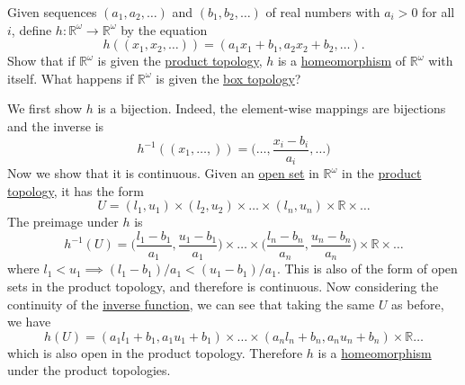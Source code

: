   \begin{exercise}[Munkres 19.8]
    Given sequences $(a_1, a_2, \ldots)$ and $(b_1, b_2, \ldots)$ of real numbers with $a_i > 0$ for all $i$, define $h : \mathbb{R}^\omega \to \mathbb{R}^\omega$ by the equation
    \begin{equation}
      h((x_1, x_2, \ldots)) = (a_1x_1 + b_1, a_2x_2 + b_2, \ldots).
    \end{equation}
    Show that if $\mathbb{R}^\omega$ is given the \hyperref[def:product-topology]{product topology}, $h$ is a \hyperref[def:homeomorphism]{homeomorphism} of $\mathbb{R}^\omega$ with itself. What happens if $\mathbb{R}^\omega$ is given the \hyperref[def:box-topology]{box topology}?
  \end{exercise}
  \begin{solution}
    We first show $h$ is a bijection. Indeed, the element-wise mappings are bijections and the inverse is 
    \begin{equation}
      h^{-1} ((x_1, \ldots, )) = \bigg(\ldots,  \frac{x_i - b_i}{a_i}, \ldots \bigg)
    \end{equation} 
    Now we show that it is continuous. Given an \hyperref[def:open-set]{open set} in $\mathbb{R}^\omega$ in the \hyperref[def:product-topology]{product topology}, it has the form 
    \begin{equation}
      U = (l_1, u_1) \times (l_2, u_2) \times \ldots \times (l_n, u_n) \times \mathbb{R} \times \ldots 
    \end{equation} 
    The preimage under $h$ is 
    \begin{equation}
      h^{-1} (U) = \bigg( \frac{l_1 - b_1}{a_1}, \frac{u_1 - b_1}{a_1} \bigg) \times \ldots \times \bigg( \frac{l_n - b_n}{a_n}, \frac{u_n - b_n}{a_n} \bigg) \times \mathbb{R} \times \ldots
    \end{equation}
    where $l_1 < u_1 \implies (l_1 - b_1) /a_1 < (u_1 - b_1) / a_1$. This is also of the form of open sets in the product topology, and therefore is continuous. Now considering the continuity of the \hyperref[st-def:inverse-function]{inverse function}, we can see that taking the same $U$ as before, we have 
    \begin{equation}
      h(U) = (a_1 l_1 + b_1, a_1 u_1 + b_1) \times \ldots \times (a_n l_n + b_n, a_n u_n + b_n) \times \mathbb{R} \ldots 
    \end{equation}
    which is also open in the product topology. Therefore $h$ is a \hyperref[def:homeomorphism]{homeomorphism} under the product topologies. 


\end{solution}
